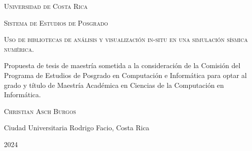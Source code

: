 \begin{titlepage}
  \begin{center}
    \large\textsc{Universidad de Costa Rica}

    \textsc{Sistema de Estudios de Posgrado}

    \vspace{4.5cm}
    \Large{\textsc{Uso de bibliotecas de análisis y visualización in-situ en una simulación sísmica numérica.}}

    \vspace{3.5cm}
   \large Propuesta de tesis de maestría sometida a la consideración de la Comisión del Programa de Estudios de Posgrado en Computación e Informática para optar al grado y título de Maestría Académica en Ciencias de la Computación en Informática.

    \vspace{1.5cm}
    \textsc{Christian Asch Burgos}

    \vspace{1.5cm}
    Ciudad Universitaria Rodrigo Facio, Costa Rica

    2024
  \normalsize
  \end{center}
\end{titlepage}
